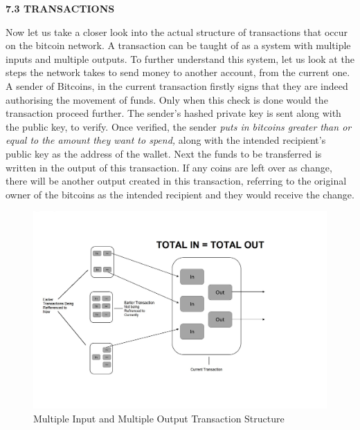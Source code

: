 \documentclass[12pt,a4paper]{report}
\begin{document}
\begin{justify}
\vspace{10mm}
\textbf{7.3 TRANSACTIONS}
\vspace{7mm}

Now let us take a closer look into the actual structure of transactions that occur on the bitcoin network. A transaction can be taught of as a system with multiple inputs and multiple outputs.\newline
To further understand this system, let us look at the steps the network takes to send money to another account, from the current one.\newline
A sender of Bitcoins, in the current transaction firstly signs that they are indeed authorising the movement of funds. Only when this check is done would the transaction proceed further. The sender's hashed private key is sent along with the public key, to verify. Once verified, the sender \textit{puts in bitcoins greater than or equal to the amount they want to spend,} along with the intended recipient's public key as the address of the wallet. Next the funds to be transferred is written in the output of this transaction. If any coins are left over as change, there will be another output created in this transaction, referring to the original owner of the bitcoins as the intended recipient and they would receive the change.\newline



\begin{figure}[h]
\centering
\caption{Multiple Input and Multiple Output Transaction Structure}
\includegraphics[scale=0.4]{pics/Transac.JPG}
\end{figure}


\end{justify}
\end{document}
